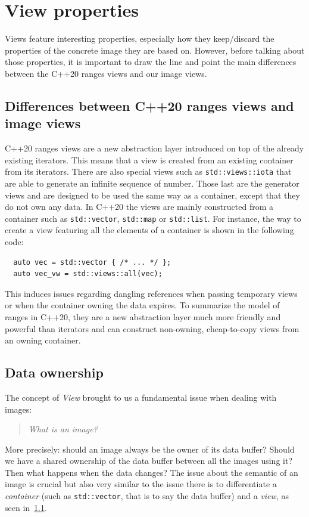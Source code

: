 \section{View properties}
\label{sec:views_properties}

Views feature interesting properties, especially how they keep/discard the properties of the concrete image they are based on. However, before talking about those properties, it is important to draw the line and point the main differences between the C++20 ranges views and our image views.

\subsection{Differences between C++20 ranges views and image views}
\label{subsec:C++20_views_vs_image_views}

C++20 ranges views are a new abstraction layer introduced on top of the already existing iterators. This means that a view is created from an existing container from its iterators. There are also special views such as \texttt{std::views::iota} that are able to generate an infinite sequence of number. Those last are the generator views and are designed to be used the same way as a container, except that they do not own any data. In C++20 the views are mainly constructed from a container such as \texttt{std::vector}, \texttt{std::map} or \texttt{std::list}. For instance, the way to create a view featuring all the elements of a container is shown in the following code:
\begin{verbatim}
  auto vec = std::vector { /* ... */ };
  auto vec_vw = std::views::all(vec);
\end{verbatim}
This induces issues regarding dangling references when passing temporary views or when the container owning the data expires. To summarize the model of ranges in C++20, they are a new abstraction layer much more friendly and powerful than iterators and can construct non-owning, cheap-to-copy views from an owning container.

\subsection{Data ownership}

The concept of \emph{View} brought to us a fundamental issue when dealing with images: \blockquote{\emph{What is an
image?}}. More precisely: should an image always be the owner of its data buffer? Should we have a shared ownership of
the data buffer between all the images using it? Then what happens when the data changes? The issue about the semantic
of an image is crucial but also very similar to the issue there is to differentiate a \emph{container} (such as
\texttt{std::vector}, that is to say the data buffer) and a \emph{view}, as seen in~\cref{subsec:C++20_views_vs_image_views}.

